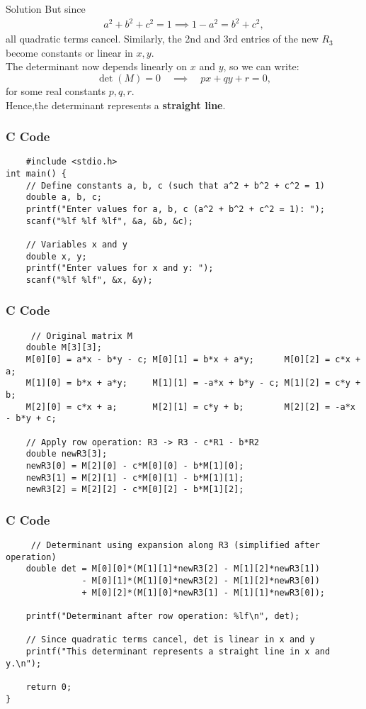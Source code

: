 \documentclass{beamer}
\begin{document}
\begin{frame}{Solution}
But since 
\begin{align}
a^2 + b^2 + c^2 = 1 \implies 1 - a^2 = b^2 + c^2,
\end{align}
all quadratic terms cancel.
Similarly, the 2nd and 3rd entries of the new $R_3$ become constants or linear in $x, y$.\\
The determinant now depends linearly on $x$ and $y$, so we can write:
\[
\det(M) = 0 \quad \implies \quad px + qy + r = 0,
\]
for some real constants $p, q, r$. \\
Hence,the determinant represents a \textbf{straight line}.  
\end{frame}
\begin{frame}[fragile]
\frametitle{C Code}
\begin{lstlisting}
    #include <stdio.h>
int main() {
    // Define constants a, b, c (such that a^2 + b^2 + c^2 = 1)
    double a, b, c;
    printf("Enter values for a, b, c (a^2 + b^2 + c^2 = 1): ");
    scanf("%lf %lf %lf", &a, &b, &c);

    // Variables x and y
    double x, y;
    printf("Enter values for x and y: ");
    scanf("%lf %lf", &x, &y);
\end{lstlisting}
\end{frame}
\begin{frame}[fragile]
\frametitle{C Code}
\begin{lstlisting}
     // Original matrix M
    double M[3][3];
    M[0][0] = a*x - b*y - c; M[0][1] = b*x + a*y;      M[0][2] = c*x + a;
    M[1][0] = b*x + a*y;     M[1][1] = -a*x + b*y - c; M[1][2] = c*y + b;
    M[2][0] = c*x + a;       M[2][1] = c*y + b;        M[2][2] = -a*x - b*y + c;

    // Apply row operation: R3 -> R3 - c*R1 - b*R2
    double newR3[3];
    newR3[0] = M[2][0] - c*M[0][0] - b*M[1][0];
    newR3[1] = M[2][1] - c*M[0][1] - b*M[1][1];
    newR3[2] = M[2][2] - c*M[0][2] - b*M[1][2];

\end{lstlisting}
\end{frame}
\begin{frame}[fragile]
\frametitle{C Code}
\begin{lstlisting}
     // Determinant using expansion along R3 (simplified after operation)
    double det = M[0][0]*(M[1][1]*newR3[2] - M[1][2]*newR3[1])
               - M[0][1]*(M[1][0]*newR3[2] - M[1][2]*newR3[0])
               + M[0][2]*(M[1][0]*newR3[1] - M[1][1]*newR3[0]);

    printf("Determinant after row operation: %lf\n", det);

    // Since quadratic terms cancel, det is linear in x and y
    printf("This determinant represents a straight line in x and y.\n");

    return 0;
}
\end{lstlisting}
\end{frame}
\end{document}
